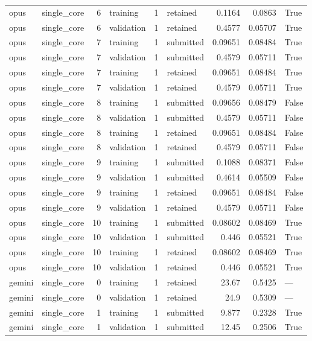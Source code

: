 \begin{tabular}{llrlrlrrl}
opus & single\_core & 6 & training & 1 & retained & 0.1164 & 0.0863 & True \\
opus & single\_core & 6 & validation & 1 & retained & 0.4577 & 0.05707 & True \\
opus & single\_core & 7 & training & 1 & submitted & 0.09651 & 0.08484 & True \\
opus & single\_core & 7 & validation & 1 & submitted & 0.4579 & 0.05711 & True \\
opus & single\_core & 7 & training & 1 & retained & 0.09651 & 0.08484 & True \\
opus & single\_core & 7 & validation & 1 & retained & 0.4579 & 0.05711 & True \\
opus & single\_core & 8 & training & 1 & submitted & 0.09656 & 0.08479 & False \\
opus & single\_core & 8 & validation & 1 & submitted & 0.4579 & 0.05711 & False \\
opus & single\_core & 8 & training & 1 & retained & 0.09651 & 0.08484 & False \\
opus & single\_core & 8 & validation & 1 & retained & 0.4579 & 0.05711 & False \\
opus & single\_core & 9 & training & 1 & submitted & 0.1088 & 0.08371 & False \\
opus & single\_core & 9 & validation & 1 & submitted & 0.4614 & 0.05509 & False \\
opus & single\_core & 9 & training & 1 & retained & 0.09651 & 0.08484 & False \\
opus & single\_core & 9 & validation & 1 & retained & 0.4579 & 0.05711 & False \\
opus & single\_core & 10 & training & 1 & submitted & 0.08602 & 0.08469 & True \\
opus & single\_core & 10 & validation & 1 & submitted & 0.446 & 0.05521 & True \\
opus & single\_core & 10 & training & 1 & retained & 0.08602 & 0.08469 & True \\
opus & single\_core & 10 & validation & 1 & retained & 0.446 & 0.05521 & True \\
gemini & single\_core & 0 & training & 1 & retained & 23.67 & 0.5425 & — \\
gemini & single\_core & 0 & validation & 1 & retained & 24.9 & 0.5309 & — \\
gemini & single\_core & 1 & training & 1 & submitted & 9.877 & 0.2328 & True \\
gemini & single\_core & 1 & validation & 1 & submitted & 12.45 & 0.2506 & True \\

\end{tabular}
